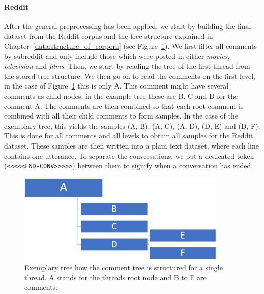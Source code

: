 \paragraph{Reddit} After the general preprocessing has been applied, we start by building the final dataset from the Reddit corpus and the tree structure explained in Chapter~\ref{data:structure_of_corpora} (see Figure~\ref{fig:data:reddit:utterance:construction}). We first filter all comments by subreddit and only include those which were posted in either \emph{movies}, \emph{television} and \emph{films}. Then, we start by reading the tree of the first thread from the stored tree structure. We then go on to read the comments on the first level, in the case of Figure~\ref{fig:data:reddit:utterance:construction} this is only A. This comment might have several comments as child nodes; in the example tree these are B, C and D for the comment A. The comments are then combined so that each root comment is combined with all their child comments to form samples. In the case of the exemplary tree, this yields the samples (A, B), (A, C), (A, D), (D, E) and (D, F). This is done for all comments and all levels to obtain all samples for the Reddit dataset. These samples are then written into a plain text dataset, where each line contains one utterance. To separate the conversations, we put a dedicated token (\texttt{<<<<<END-CONV>>>>>}) between them to signify when a conversation has ended.
\\
\begin{figure}[H]
	\centering
	\includegraphics[width=10cm]{img/reddit_utterance_construction.PNG}
	\caption{Exemplary tree how the comment tree is structured for a single thread. A stands for the threads root node and B to F are comments.}
	\label{fig:data:reddit:utterance:construction}
\end{figure}

